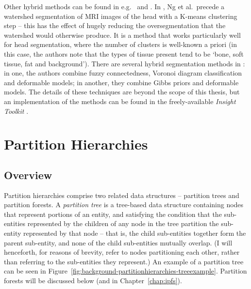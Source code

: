 Other hybrid methods can be found in e.g.~\cite{ng06} and \cite{itk}. In \cite{ng06}, Ng et al.\ precede a watershed segmentation of MRI images of the head with a K-means clustering step -- this has the effect of hugely reducing the oversegmentation that the watershed would otherwise produce. It is a method that works particularly well for head segmentation, where the number of clusters is well-known a priori (in this case, the authors note that the types of tissue present tend to be `bone, soft tissue, fat and background'). There are several hybrid segmentation methods in \cite{itk}: in one, the authors combine fuzzy connectedness, Voronoi diagram classification and deformable models; in another, they combine Gibbs priors and deformable models. The details of these techniques are beyond the scope of this thesis, but an implementation of the methods can be found in the freely-available \emph{Insight Toolkit} \cite{itk}.


\clearpage

\section{Partition Hierarchies}
\label{sec:background-partitionhierarchies}


\subsection{Overview}

Partition hierarchies comprise two related data structures -- partition trees and partition forests. A \emph{partition tree} is a tree-based data structure containing nodes that represent portions of an entity, and satisfying the condition that the sub-entities represented by the children of any node in the tree partition the sub-entity represented by that node -- that is, the child sub-entities together form the parent sub-entity, and none of the child sub-entities mutually overlap. (I will henceforth, for reasons of brevity, refer to nodes partitioning each other, rather than referring to the sub-entities they represent.) An example of a partition tree can be seen in Figure~\ref{fig:background-partitionhierarchies-treeexample}. Partition forests will be discussed below (and in Chapter~\ref{chap:ipfs}).


